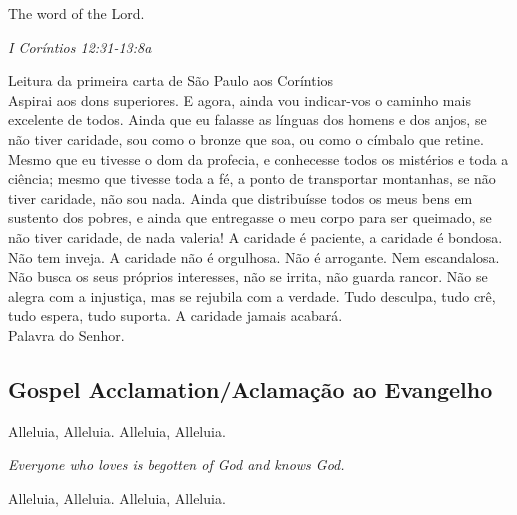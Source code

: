 \documentclass[10pt,a5]{article}
\begin{document}
\begin{paracol}{2}
The word of the Lord. \\


 \switchcolumn
 \textit{I Coríntios 12:31-13:8a}

\hspace{2em} Leitura da primeira carta de S\~ao Paulo aos Cor\'intios\\

Aspirai aos dons superiores. E agora, ainda vou indicar-vos o caminho mais excelente de todos.
Ainda que eu falasse as línguas dos homens e dos anjos, se não tiver caridade, sou como o bronze que soa, ou como o címbalo que retine.
Mesmo que eu tivesse o dom da profecia, e conhecesse todos os mistérios e toda a ciência; mesmo que tivesse toda a fé, a ponto de transportar montanhas, se não tiver caridade, não sou nada.
Ainda que distribuísse todos os meus bens em sustento dos pobres, e ainda que entregasse o meu corpo para ser queimado, se não tiver caridade, de nada valeria!
A caridade é paciente, a caridade é bondosa. Não tem inveja. A caridade não é orgulhosa. Não é arrogante.
Nem escandalosa. Não busca os seus próprios interesses, não se irrita, não guarda rancor.
Não se alegra com a injustiça, mas se rejubila com a verdade.
Tudo desculpa, tudo crê, tudo espera, tudo suporta.
A caridade jamais acabará. \\

Palavra do Senhor. \\


 \switchcolumn*

\end{paracol}

\begin{center}

\subsection*{Gospel Acclamation/Aclama\c{c}\~ao ao Evangelho}

Alleluia, Alleluia. Alleluia, Alleluia.

\textit{Everyone who loves is begotten of God and knows God.}

Alleluia, Alleluia. Alleluia, Alleluia.

\end{center}
\end{document}
